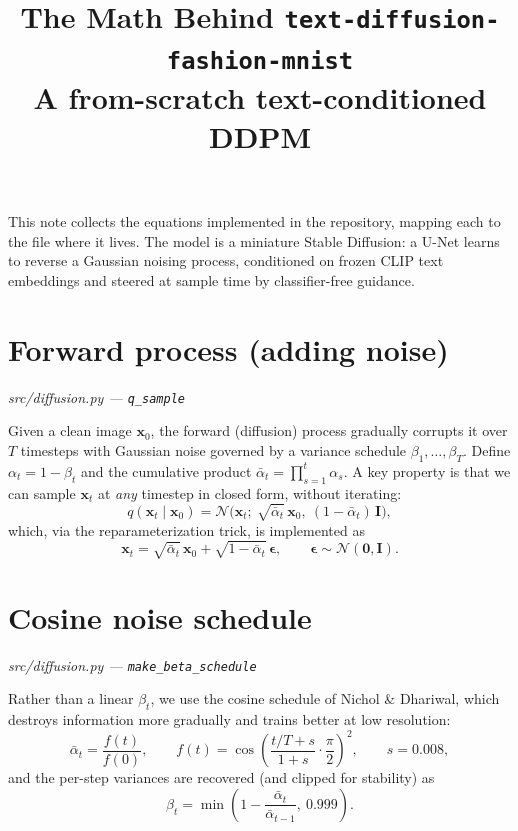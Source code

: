 \documentclass[11pt]{article}
\title{\textbf{The Math Behind \texttt{text-diffusion-fashion-mnist}}\\[0.3em]
\large A from-scratch text-conditioned DDPM}
\author{}
\date{}
\newcommand{\N}{\mathcal{N}}
\newcommand{\x}{\mathbf{x}}
\newcommand{\eps}{\boldsymbol{\epsilon}}
\newcommand{\ab}{\bar{\alpha}}          %
\begin{document}
\maketitle
\vspace{-3em}

\noindent This note collects the equations implemented in the repository, mapping each to the
file where it lives. The model is a miniature Stable Diffusion: a U-Net learns to reverse a
Gaussian noising process, conditioned on frozen CLIP text embeddings and steered at sample time
by classifier-free guidance.

\section{Forward process (adding noise)}
\hfill\textit{\small src/diffusion.py — \texttt{q\_sample}}

Given a clean image $\x_0$, the forward (diffusion) process gradually corrupts it over $T$
timesteps with Gaussian noise governed by a variance schedule $\beta_1, \dots, \beta_T$. Define
$\alpha_t = 1 - \beta_t$ and the cumulative product $\ab_t = \prod_{s=1}^{t} \alpha_s$. A key
property is that we can sample $\x_t$ at \emph{any} timestep in closed form, without iterating:
\begin{equation}
  q(\x_t \mid \x_0) = \N\!\big(\x_t;\ \sqrt{\ab_t}\,\x_0,\ (1-\ab_t)\,\mathbf{I}\big),
\end{equation}
which, via the reparameterization trick, is implemented as
\begin{equation}
  \boxed{\ \x_t = \sqrt{\ab_t}\,\x_0 + \sqrt{1-\ab_t}\,\eps, \qquad \eps \sim \N(\mathbf{0}, \mathbf{I}).\ }
\end{equation}

\section{Cosine noise schedule}
\hfill\textit{\small src/diffusion.py — \texttt{make\_beta\_schedule}}

Rather than a linear $\beta_t$, we use the cosine schedule of Nichol \& Dhariwal, which destroys
information more gradually and trains better at low resolution:
\begin{equation}
  \ab_t = \frac{f(t)}{f(0)}, \qquad
  f(t) = \cos\!\left( \frac{t/T + s}{1 + s}\cdot\frac{\pi}{2} \right)^{\!2},
  \qquad s = 0.008,
\end{equation}
and the per-step variances are recovered (and clipped for stability) as
\begin{equation}
  \beta_t = \min\!\left(1 - \frac{\ab_t}{\ab_{t-1}},\ 0.999\right).
\end{equation}
\end{document}
